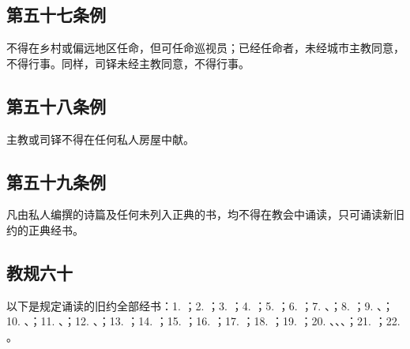 
\subsection{第五十七条例}

不得在乡村或偏远地区任命，但可任命巡视员；已经任命者，未经城市主教同意，不得行事。同样，司铎未经主教同意，不得行事。\par


\subsection{第五十八条例}

主教或司铎不得在任何私人房屋中献。\par


\subsection{第五十九条例}

凡由私人编撰的诗篇及任何未列入正典的书，均不得在教会中诵读，只可诵读新旧约的正典经书。\par


\subsection{教规六十}

\par

以下是规定诵读的旧约全部经书：1. ；2. ；3. ；4. ；5. ；6. ；7. 、；8. ；9. 、；10. 、；11. 、；12. 、；13. ；14. ；15. ；16. ；17. ；18. ；19. ；20. 、、、；21. ；22. 。\par


